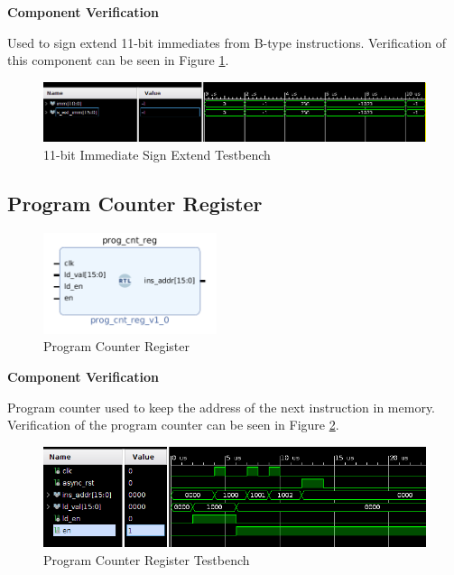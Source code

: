 \documentclass{article}
\newcommand{\stitle}{Component Verification}
\begin{document}
\begin{par}
	\textbf{\stitle}
	\begin{par}
		Used to sign extend 11-bit immediates from B-type instructions. Verification of this component can be seen in Figure \ref{fig:immExtTb}.
	\end{par}

	\begin{figure}[H]
		\centering
		\includegraphics[width=7in]{img/immExtTB.png}
		\caption{11-bit Immediate Sign Extend Testbench}
		\label{fig:immExtTb}
	\end{figure}
	
	\newpage
	
	\subsection{Program Counter Register}
	
	\begin{figure}[H]
		\centering
		\includegraphics[width=2in]{img/progCnt.png}
		\caption{Program Counter Register}
	\end{figure}
	
	\textbf{\stitle}
	\begin{par}
		Program counter used to keep the address of the next instruction in memory. Verification of the program counter can be seen in Figure \ref{fig:progcnttb}.
	\end{par}
	
	\begin{figure}[H]
		\centering
		\includegraphics[width=6in]{img/progCntTB.png}
		\caption{Program Counter Register Testbench}
		\label{fig:progcnttb}
	\end{figure}


\end{par}
\end{document}
